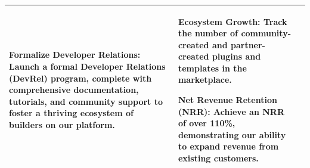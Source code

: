 \documentclass[11pt, a4paper, oneside]{article}
\begin{document}
\begin{table}[!htbp]
\begin{tabular}{p{} p{} p{}}
\textbf{Formalize Developer Relations:} Launch a formal Developer Relations (DevRel) program, complete with comprehensive documentation, tutorials, and community support to foster a thriving ecosystem of builders on our platform.
&
\textbf{Ecosystem Growth:} Track the number of community-created and partner-created plugins and templates in the marketplace.

\textbf{Net Revenue Retention (NRR):} Achieve an NRR of over 110\%, demonstrating our ability to expand revenue from existing customers.
\\
\bottomrule
\end{tabular}
\end{table}
\end{document}
